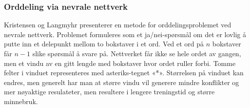 %
%
%
%
%
%
%
%
%
%

\subsubsection{Orddeling via nevrale nettverk}

Kristensen og Langmyhr \cite{kristensen1998two} presenterer en metode for orddelingsproblemet ved nevrale nettverk. Problemet formuleres som et ja/nei-spørsmål om det er lovlig å putte inn et delepunkt mellom to bokstaver i et ord. Ved et ord på $n$ bokstaver får $n-1$ slike spørsmål å svare på. Nettverket får ikke se hele ordet av gangen, men et vindu av en gitt lengde med bokstaver hvor ordet ruller forbi. Tomme felter i vinduet representeres med asteriks-tegnet «*». Størrelsen på vinduet kan endres, men generelt har man at større vindu vil generere mindre konflikter og mer nøyaktige resulateter, men resultere i lengere treningstid og større minnebruk. 

